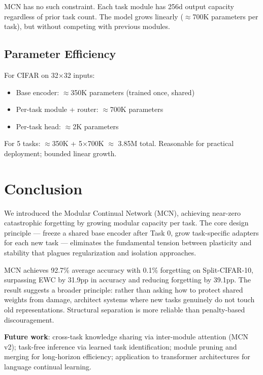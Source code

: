 \documentclass[10pt,twocolumn]{article}
\begin{document}
MCN has no such constraint. Each task module has 256d output capacity regardless of prior task count. The model grows linearly ($\approx$700K parameters per task), but without competing with previous modules.

\subsection{Parameter Efficiency}

For CIFAR on 32$\times$32 inputs:
\begin{itemize}
    \item Base encoder: $\approx$350K parameters (trained once, shared)
    \item Per-task module + router: $\approx$700K parameters
    \item Per-task head: $\approx$2K parameters
\end{itemize}

For 5 tasks: $\approx$350K + 5$\times$700K $\approx$ 3.85M total. Reasonable for practical deployment; bounded linear growth.

\section{Conclusion}

We introduced the Modular Continual Network (MCN), achieving near-zero catastrophic forgetting by growing modular capacity per task. The core design principle --- freeze a shared base encoder after Task 0, grow task-specific adapters for each new task --- eliminates the fundamental tension between plasticity and stability that plagues regularization and isolation approaches.

MCN achieves 92.7\% average accuracy with 0.1\% forgetting on Split-CIFAR-10, surpassing EWC by 31.9pp in accuracy and reducing forgetting by 39.1pp. The result suggests a broader principle: rather than asking how to protect shared weights from damage, architect systems where new tasks genuinely do not touch old representations. Structural separation is more reliable than penalty-based discouragement.

\textbf{Future work}: cross-task knowledge sharing via inter-module attention (MCN v2); task-free inference via learned task identification; module pruning and merging for long-horizon efficiency; application to transformer architectures for language continual learning.
\end{document}
